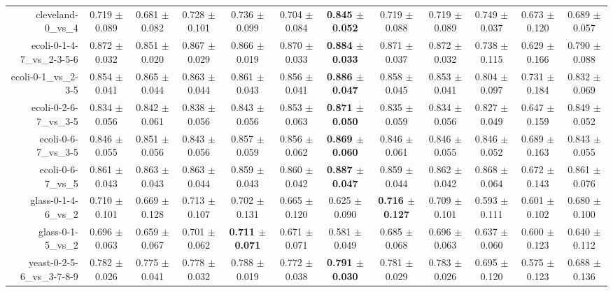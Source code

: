 \begin{table}[!ht]
{\begin{tabular}{r c c c c c c c c c c c}
cleveland-0\_vs\_4 & 0.719 $\pm$ 0.089 & 0.681 $\pm$ 0.082 & 0.728 $\pm$ 0.101 & 0.736 $\pm$ 0.099 & 0.704 $\pm$ 0.084 & \textbf{0.845 $\pm$ 0.052} & 0.719 $\pm$ 0.088 & 0.719 $\pm$ 0.089 & 0.749 $\pm$ 0.037 & 0.673 $\pm$ 0.120 & 0.689 $\pm$ 0.057 \\
ecoli-0-1-4-7\_vs\_2-3-5-6 & 0.872 $\pm$ 0.032 & 0.851 $\pm$ 0.020 & 0.867 $\pm$ 0.029 & 0.866 $\pm$ 0.019 & 0.870 $\pm$ 0.033 & \textbf{0.884 $\pm$ 0.033} & 0.871 $\pm$ 0.037 & 0.872 $\pm$ 0.032 & 0.738 $\pm$ 0.115 & 0.629 $\pm$ 0.166 & 0.790 $\pm$ 0.088 \\
ecoli-0-1\_vs\_2-3-5 & 0.854 $\pm$ 0.041 & 0.865 $\pm$ 0.044 & 0.863 $\pm$ 0.044 & 0.861 $\pm$ 0.043 & 0.856 $\pm$ 0.041 & \textbf{0.886 $\pm$ 0.047} & 0.858 $\pm$ 0.045 & 0.853 $\pm$ 0.041 & 0.804 $\pm$ 0.097 & 0.731 $\pm$ 0.184 & 0.832 $\pm$ 0.069 \\
ecoli-0-2-6-7\_vs\_3-5 & 0.834 $\pm$ 0.056 & 0.842 $\pm$ 0.061 & 0.838 $\pm$ 0.056 & 0.843 $\pm$ 0.056 & 0.853 $\pm$ 0.063 & \textbf{0.871 $\pm$ 0.050} & 0.835 $\pm$ 0.059 & 0.834 $\pm$ 0.056 & 0.827 $\pm$ 0.049 & 0.647 $\pm$ 0.159 & 0.849 $\pm$ 0.052 \\
ecoli-0-6-7\_vs\_3-5 & 0.846 $\pm$ 0.055 & 0.851 $\pm$ 0.056 & 0.843 $\pm$ 0.056 & 0.857 $\pm$ 0.059 & 0.856 $\pm$ 0.062 & \textbf{0.869 $\pm$ 0.060} & 0.846 $\pm$ 0.061 & 0.846 $\pm$ 0.055 & 0.846 $\pm$ 0.052 & 0.689 $\pm$ 0.163 & 0.843 $\pm$ 0.055 \\
ecoli-0-6-7\_vs\_5 & 0.861 $\pm$ 0.043 & 0.863 $\pm$ 0.043 & 0.863 $\pm$ 0.044 & 0.859 $\pm$ 0.043 & 0.860 $\pm$ 0.042 & \textbf{0.887 $\pm$ 0.047} & 0.859 $\pm$ 0.044 & 0.862 $\pm$ 0.042 & 0.868 $\pm$ 0.064 & 0.672 $\pm$ 0.143 & 0.861 $\pm$ 0.076 \\
glass-0-1-4-6\_vs\_2 & 0.710 $\pm$ 0.101 & 0.669 $\pm$ 0.128 & 0.713 $\pm$ 0.107 & 0.702 $\pm$ 0.131 & 0.665 $\pm$ 0.120 & 0.625 $\pm$ 0.090 & \textbf{0.716 $\pm$ 0.127} & 0.709 $\pm$ 0.101 & 0.593 $\pm$ 0.111 & 0.601 $\pm$ 0.102 & 0.680 $\pm$ 0.100 \\
glass-0-1-5\_vs\_2 & 0.696 $\pm$ 0.063 & 0.659 $\pm$ 0.067 & 0.701 $\pm$ 0.062 & \textbf{0.711 $\pm$ 0.071} & 0.671 $\pm$ 0.071 & 0.581 $\pm$ 0.049 & 0.685 $\pm$ 0.068 & 0.696 $\pm$ 0.063 & 0.637 $\pm$ 0.060 & 0.600 $\pm$ 0.123 & 0.640 $\pm$ 0.112 \\
yeast-0-2-5-6\_vs\_3-7-8-9 & 0.782 $\pm$ 0.026 & 0.775 $\pm$ 0.041 & 0.778 $\pm$ 0.032 & 0.788 $\pm$ 0.019 & 0.772 $\pm$ 0.038 & \textbf{0.791 $\pm$ 0.030} & 0.781 $\pm$ 0.029 & 0.783 $\pm$ 0.026 & 0.695 $\pm$ 0.120 & 0.575 $\pm$ 0.123 & 0.688 $\pm$ 0.136 \\

\end{tabular}}
\end{table}
